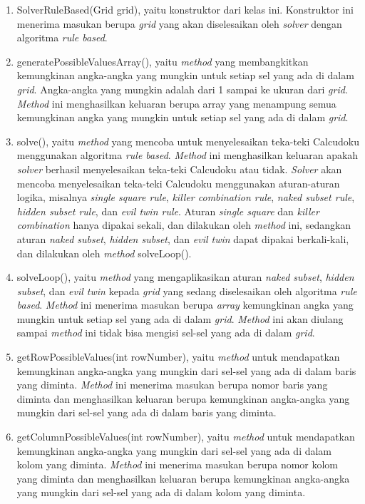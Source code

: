 \begin{enumerate}
\item SolverRuleBased(Grid grid), yaitu konstruktor dari kelas ini. Konstruktor ini menerima masukan berupa \textit{grid} yang akan diselesaikan oleh \textit{solver} dengan algoritma \textit{rule based}.
\item generatePossibleValuesArray(), yaitu \textit{method} yang membangkitkan kemungkinan angka-angka yang mungkin untuk setiap sel yang ada di dalam \textit{grid}. Angka-angka yang mungkin adalah dari 1 sampai ke ukuran dari \textit{grid}. \textit{Method} ini menghasilkan keluaran berupa array yang menampung semua kemungkinan angka yang mungkin untuk setiap sel yang ada di dalam \textit{grid}.
\item solve(), yaitu \textit{method} yang mencoba untuk menyelesaikan teka-teki Calcudoku menggunakan algoritma \textit{rule based}. \textit{Method} ini menghasilkan keluaran apakah \textit{solver} berhasil menyelesaikan teka-teki Calcudoku atau tidak. \textit{Solver} akan mencoba menyelesaikan teka-teki Calcudoku menggunakan aturan-aturan logika, misalnya \textit{single square rule}, \textit{killer combination rule}, \textit{naked subset rule}, \textit{hidden subset rule}, dan \textit{evil twin rule}. Aturan \textit{single square} dan \textit{killer combination} hanya dipakai sekali, dan dilakukan oleh \textit{method} ini, sedangkan aturan \textit{naked subset}, \textit{hidden subset}, dan \textit{evil twin} dapat dipakai berkali-kali, dan dilakukan oleh \textit{method} solveLoop().
\item solveLoop(), yaitu \textit{method} yang mengaplikasikan aturan \textit{naked subset}, \textit{hidden subset}, dan \textit{evil twin} kepada \textit{grid} yang sedang diselesaikan oleh algoritma \textit{rule based}. \textit{Method} ini menerima masukan berupa \textit{array} kemungkinan angka yang mungkin untuk setiap sel yang ada di dalam \textit{grid}. \textit{Method} ini akan diulang sampai \textit{method} ini tidak bisa mengisi sel-sel yang ada di dalam \textit{grid}.
\item getRowPossibleValues(int rowNumber), yaitu \textit{method} untuk mendapatkan kemungkinan angka-angka yang mungkin dari sel-sel yang ada di dalam baris yang diminta. \textit{Method} ini menerima masukan berupa nomor baris yang diminta dan menghasilkan keluaran berupa kemungkinan angka-angka yang mungkin dari sel-sel yang ada di dalam baris yang diminta.
\item getColumnPossibleValues(int rowNumber), yaitu \textit{method} untuk mendapatkan kemungkinan angka-angka yang mungkin dari sel-sel yang ada di dalam kolom yang diminta. \textit{Method} ini menerima masukan berupa nomor kolom yang diminta dan menghasilkan keluaran berupa kemungkinan angka-angka yang mungkin dari sel-sel yang ada di dalam kolom yang diminta.

\end{enumerate}
